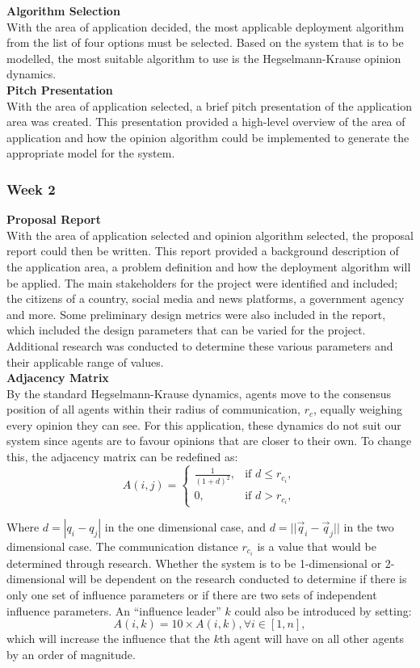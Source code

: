 \documentclass[../CourseManual.tex]{subfiles}
\begin{document}
\textbf{Algorithm Selection}\\
With the area of application decided, the most applicable deployment algorithm from the list of four options must be selected. Based on the system that is to be modelled, the most suitable algorithm to use is the Hegselmann-Krause opinion dynamics.\\

\textbf{Pitch Presentation}\\
With the area of application selected, a brief pitch presentation of the application area was created. This presentation provided a high-level overview of the area of application and how the opinion algorithm could be implemented to generate the appropriate model for the system.

\subsubsection{Week 2} \label{Week 2: Opinion}
\textbf{Proposal Report}\\
With the area of application selected and opinion algorithm selected, the proposal report could then be written. This report provided a background description of the application area, a problem definition and how the deployment algorithm will be applied. The main stakeholders for the project were identified and included; the citizens of a country, social media and news platforms, a government agency and more. Some preliminary design metrics were also included in the report, which included the design parameters that can be varied for the project. Additional research was conducted to determine these various parameters and their applicable range of values.\\

\textbf{Adjacency Matrix}\\
By the standard Hegselmann-Krause dynamics, agents move to the consensus position of all agents within their radius of communication, $r_c$, equally weighing every opinion they can see. For this application, these dynamics do not suit our system since agents are to favour opinions that are closer to their own. To change this, the adjacency matrix can be redefined as:
\[
A(i,j) = 
\begin{cases}
\frac{1}{(1+d)^2}, & \text{if } d \leq r_{c_i},\\
0, & \text{if } d > r_{c_i},
\end{cases}
\]

Where $d = |q_i - q_j|$ in the one dimensional case, and $d = ||\vec{q}_i - \vec{q}_j||$ in the two dimensional case. The communication distance $r_{c_i}$ is a value that would be determined through research. Whether the system is to be 1-dimensional or 2-dimensional will be dependent on the research conducted to determine if there is only one set of influence parameters or if there are two sets of independent influence parameters. An ``influence leader” $k$ could also be introduced by setting:
\[
A(i,k) = 10 \times A(i,k), \forall i \in [1,n],
\]
which will increase the influence that the $k$th agent will have on all other agents by an order of magnitude.
\end{document}
